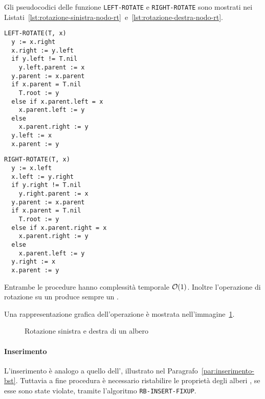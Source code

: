 \documentclass[italian, 10pt]{article}
\begin{document}
\bigskip
Gli pseudocodici delle funzione \texttt{LEFT-ROTATE} e \texttt{RIGHT-ROTATE} sono mostrati nei Listati~\ref{lst:rotazione-sinistra-nodo-rt}~e~\ref{lst:rotazione-destra-nodo-rt}.

\begin{minipage}[t]{0.495\linewidth}
  \begin{lstlisting}[style=pseudocode, caption={Rotazione sinistra di un nodo in un RB}, label={lst:rotazione-sinistra-nodo-rt}]
LEFT-ROTATE(T, x)
  y := x.right
  x.right := y.left
  if y.left != T.nil
    y.left.parent := x
  y.parent := x.parent
  if x.parent = T.nil
    T.root := y
  else if x.parent.left = x
    x.parent.left := y
  else
    x.parent.right := y
  y.left := x
  x.parent := y
  \end{lstlisting}
\end{minipage}
\begin{minipage}[t]{0.495\linewidth}
  \begin{lstlisting}[style=pseudocode, caption={Rotazione destra di un nodo in un RB}, label={lst:rotazione-destra-nodo-rt}]
RIGHT-ROTATE(T, x)
  y := x.left
  x.left := y.right
  if y.right != T.nil
    y.right.parent := x
  y.parent := x.parent
  if x.parent = T.nil
    T.root := y
  else if x.parent.right = x
    x.parent.right := y
  else
    x.parent.left := y
  y.right := x
  x.parent := y
  \end{lstlisting}
\end{minipage}

\bigskip
Entrambe le procedure hanno complessità temporale \(\mathcal{O}(1)\).
Inoltre l'operazione di rotazione su un \RB produce sempre un \RB.

\bigskip
Una rappresentazione grafica dell'operazione è mostrata nell'immagine~\ref{fig:rotazione-sinistra-destra-rb}.

\begin{figure}[htbp]
  \bigskip
  \centering
  \caption{Rotazione sinistra e destra di un albero \RB}
  \label{fig:rotazione-sinistra-destra-rb}
  \bigskip
\end{figure}

\paragraph{Inserimento}
\label{par:inserimento-rb}

L'inserimento è analogo a quello dell'\BST, illustrato nel Paragrafo~\ref{par:inserimento-bst}.
Tuttavia a fine procedura è necessario ristabilire le proprietà degli alberi \RB, se esse sono state violate, tramite l'algoritmo \texttt{RB-INSERT-FIXUP}.
\end{document}
